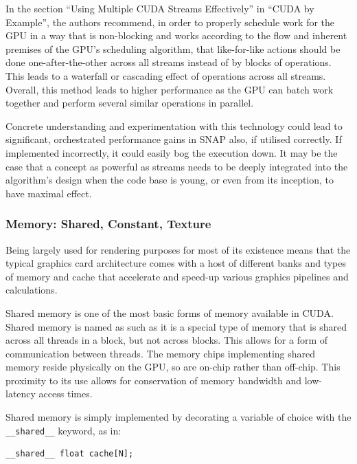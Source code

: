 \documentclass[conference]{IEEEtran}
\begin{document}
In the section ``Using Multiple CUDA Streams Effectively'' in ``CUDA by Example''\cite{sanders2010cuda}, the authors recommend, in order to properly schedule work for the GPU in a way that is non-blocking and works according to the flow and inherent premises of the GPU's scheduling algorithm, that like-for-like actions should be done one-after-the-other across all streams instead of by blocks of operations. This leads to a waterfall or cascading effect of operations across all streams. Overall, this method leads to higher performance as the GPU can batch work together and perform several similar operations in parallel.

Concrete understanding and experimentation with this technology could lead to significant, orchestrated performance gains in SNAP also, if utilised correctly. If implemented incorrectly, it could easily bog the execution down. It may be the case that a concept as powerful as streams needs to be deeply integrated into the algorithm's design when the code base is young, or even from its inception, to have maximal effect.


\subsubsection{Memory: Shared, Constant, Texture}

Being largely used for rendering purposes for most of its existence means that the typical graphics card architecture comes with a host of different banks and types of memory and cache that accelerate and speed-up various graphics pipelines and calculations.

Shared memory is one of the most basic forms of memory available in CUDA. Shared memory is named as such as it is a special type of memory that is shared across all threads in a block, but not across blocks. This allows for a form of communication between threads. The memory chips implementing shared memory reside physically on the GPU, so are on-chip rather than off-chip. This proximity to its use allows for conservation of memory bandwidth and low-latency access times.

Shared memory is simply implemented by decorating a variable of choice with the \texttt{\_\_shared\_\_} keyword, as in:

\begin{lstlisting}[breaklines]
    __shared__ float cache[N];
\end{lstlisting}
\end{document}
